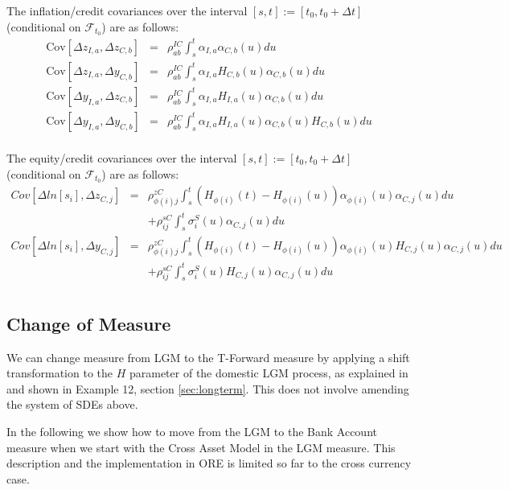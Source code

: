 \documentclass[12pt, a4paper]{article}
\begin{document}
{\begin{appendix}
The inflation/credit covariances over the interval $[s,t] := [t_0, t_0+\Delta t]$ (conditional on $\mathcal{F}_{t_0}$) are as follows:
\begin{eqnarray*}
  \mathrm{Cov}[ \Delta z_{I,a}, \Delta z_{C,b} ] &=&
  \rho_{ab}^{IC}\int_s^t \alpha_{I,a} \alpha_{C,b}(u) du\\
  \mathrm{Cov}[ \Delta z_{I,a}, \Delta y_{C,b} ] &=&
  \rho_{ab}^{IC}\int_s^t \alpha_{I,a} H_{C,b}(u) \alpha_{C,b}(u) du\\
  \mathrm{Cov}[ \Delta y_{I,a}, \Delta z_{C,b} ] &=&
  \rho_{ab}^{IC}\int_s^t \alpha_{I,a} H_{I,a}(u) \alpha_{C,b}(u) du\\
  \mathrm{Cov}[ \Delta y_{I,a}, \Delta y_{C,b} ] &=&
  \rho_{ab}^{IC}\int_s^t \alpha_{I,a} H_{I,a}(u) \alpha_{C,b}(u) H_{C,b}(u) du\\
\end{eqnarray*}

The equity/credit covariances over the interval $[s,t] := [t_0, t_0+\Delta t]$ (conditional on $\mathcal{F}_{t_0}$) are as follows:
\begin{eqnarray*}
	Cov \left[\Delta ln[s_i], \Delta z_{C,j} \right] &=&
	\rho_{\phi(i)j}^{zC} \int_s^t (H_{\phi(i)} (t) - H_{\phi(i)} (u)) \alpha_{\phi(i)} (u) \alpha_{C,j} (u) du\\
	&&+ \rho_{ij}^{sC} \int_s^t \sigma_i^S (u) \alpha_{C,j} (u) du\\	
	Cov \left[\Delta ln[s_i], \Delta y_{C,j} \right] &=&
	\rho_{\phi(i)j}^{zC} \int_s^t (H_{\phi(i)} (t) - H_{\phi(i)} (u)) \alpha_{\phi(i)} (u) H_{C,j} (u) \alpha_{C,j} (u) du\\
	&&+ \rho_{ij}^{sC} \int_s^t \sigma_i^S (u) H_{C,j} (u) \alpha_{C,j} (u) du\\
\end{eqnarray*}

\subsection{Change of Measure}

We can change measure from LGM to the T-Forward measure by applying a shift transformation to the $H$ parameter of the domestic LGM process, as explained in \cite{Lichters} and shown in Example 12, section \ref{sec:longterm}. This does not involve amending the system of SDEs above.

\medskip
\noindent
In the following we show how to move from the LGM to the Bank Account measure when we start with the Cross Asset Model in the LGM measure. This description and the implementation in ORE is limited so far to the cross currency case.


\end{appendix}}
\end{document}
